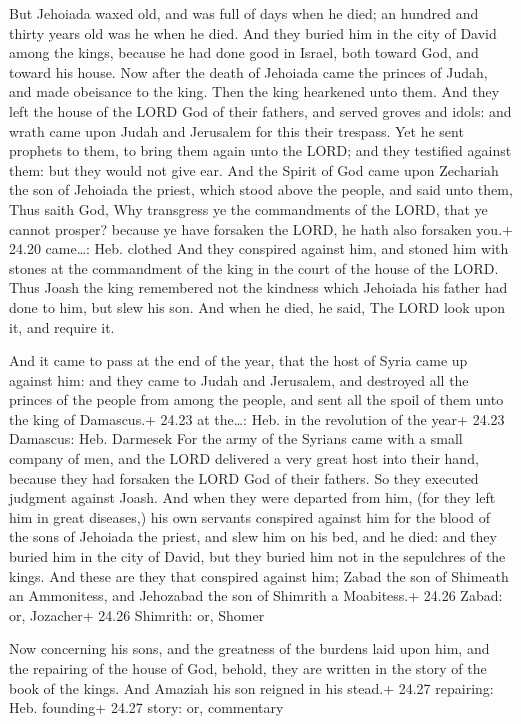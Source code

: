  But Jehoiada waxed old, and was full of days when he
died; an hundred and thirty years old was he when he died. 
And they buried him in the city of David among the kings, because he had
done good in Israel, both toward God, and toward his house.
 Now after the death of Jehoiada came the princes of Judah,
and made obeisance to the king. Then the king hearkened unto them.
 And they left the house of the LORD God of their fathers,
and served groves and idols: and wrath came upon Judah and Jerusalem for
this their trespass.  Yet he sent prophets to them, to
bring them again unto the LORD; and they testified against them: but
they would not give ear.  And the Spirit of God came upon
Zechariah the son of Jehoiada the priest, which stood above the people,
and said unto them, Thus saith God, Why transgress ye the commandments
of the LORD, that ye cannot prosper? because ye have forsaken the LORD,
he hath also forsaken you.+ 24.20 came\ldots: Heb. clothed 
And they conspired against him, and stoned him with stones at the
commandment of the king in the court of the house of the LORD.
 Thus Joash the king remembered not the kindness which
Jehoiada his father had done to him, but slew his son. And when he died,
he said, The LORD look upon it, and require it.

 And it came to pass at the end of the year, that the
host of Syria came up against him: and they came to Judah and Jerusalem,
and destroyed all the princes of the people from among the people, and
sent all the spoil of them unto the king of Damascus.+ 24.23 at
the\ldots: Heb. in the revolution of the year+ 24.23 Damascus: Heb.
Darmesek  For the army of the Syrians came with a small
company of men, and the LORD delivered a very great host into their
hand, because they had forsaken the LORD God of their fathers. So they
executed judgment against Joash.  And when they were
departed from him, (for they left him in great diseases,) his own
servants conspired against him for the blood of the sons of Jehoiada the
priest, and slew him on his bed, and he died: and they buried him in the
city of David, but they buried him not in the sepulchres of the kings.
 And these are they that conspired against him; Zabad the
son of Shimeath an Ammonitess, and Jehozabad the son of Shimrith a
Moabitess.+ 24.26 Zabad: or, Jozacher+ 24.26 Shimrith: or, Shomer

 Now concerning his sons, and the greatness of the
burdens laid upon him, and the repairing of the house of God, behold,
they are written in the story of the book of the kings. And Amaziah his
son reigned in his stead.+ 24.27 repairing: Heb. founding+ 24.27 story:
or, commentary

